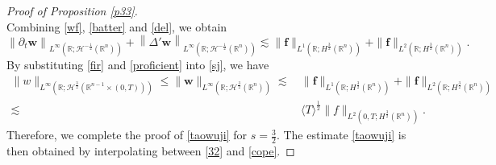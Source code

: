 \documentclass[10pt,a4paper]{amsart}
\begin{document}
\begin{proof}[Proof of Proposition \ref{p33}]
\begin{equation}
	\end{equation}
	Combining \eqref{wf}, \eqref{batter} and \eqref{del}, we obtain
	\begin{equation}\label{proficient} \left\|\partial_{t}\boldsymbol{w}\right\|_{L^{\infty}(\mathbb{R};\mathcal{H}^{-\frac{1}{2}}(\mathbb{R}^{n}))}+\left\|\Delta'\boldsymbol{w}\right\|_{L^{\infty}(\mathbb{R};\mathcal{H}^{-\frac{1}{2}}(\mathbb{R}^{n}))}\lesssim  \|\boldsymbol{f}\|_{L^{1}(\mathbb{R};H^{\frac{3}{2}}(\mathbb{R}^{n}))}+\|\boldsymbol{f}\|_{L^{2}(\mathbb{R};H^{\frac{3}{2}}(\mathbb{R}^{n}))}.
	\end{equation}
	By substituting \eqref{fir} and \eqref{proficient} into \eqref{sj}, we have
	\begin{equation}\label{32}
		\begin{aligned}
			\|w\|_{L^{\infty}(\mathbb{R};\mathcal{H}^{\frac{3}{2}}(\mathbb{R}^{n-1}\times(0,T)))}\leq \|\boldsymbol{w}\|_{L^{\infty}(\mathbb{R};\mathcal{H}^{\frac{3}{2}}(\mathbb{R}^{n}))}\lesssim&\,\|\boldsymbol{f}\|_{L^{1}(\mathbb{R};H^{\frac{3}{2}}(\mathbb{R}^{n}))}+\|\boldsymbol{f}\|_{L^{2}(\mathbb{R};H^{\frac{3}{2}}(\mathbb{R}^{n}))}\\
			\lesssim&\,\langle T\rangle^{\frac{1}{2}} \|f\|_{L^{2}(0,T;H^{\frac{3}{2}}(\mathbb{R}^{n}))}.
		\end{aligned}
	\end{equation}
	Therefore, we complete the proof of \eqref{taowuji} for $s=\frac{3}{2}$. The estimate \eqref{taowuji} is then  obtained by  interpolating between \eqref{32} and \eqref{cope}.
\end{proof}
\end{document}
